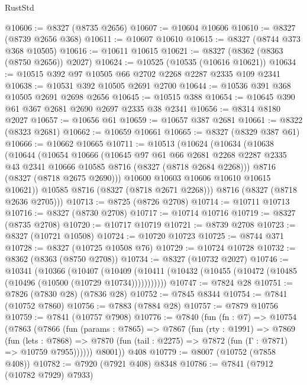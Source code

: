 \begin{lexlean}{RustStd}
\begin{coremodule}
@10606 := @8327 (@8735 @2656)
@10607 := @10604 @10606
@10610 := @8327 (@8739 @2656 @368)
@10611 := @10607 @10610
@10615 := @8327 (@8744 @373 @368 @10505)
@10616 := @10611 @10615
@10621 := @8327 (@8362 (@8363 (@8750 @2656)) @2027)
@10624 := @10525 (@10535 (@10616 @10621))
@10634 := @10515 @392 @97 @10505 @66 @2702 @2268 @2287 @2335 @109 @2341
@10638 := @10531 @392 @10505 @2691 @2700
@10644 := @10536 @391 @368 @10505 @2691 @2698 @2656
@10645 := @10515 @388
@10654 := @10645 @390 @61 @367 @2681 @2690 @2697 @2335 @38 @2341
@10656 := @8314 @8180 @2027
@10657 := @10656 @61
@10659 := @10657 @387 @2681
@10661 := @8322 (@8323 @2681)
@10662 := @10659 @10661
@10665 := @8327 (@8329 @387 @61)
@10666 := @10662 @10665
@10711 := @10513
    (@10624
      (@10634
        (@10638
          (@10644
            (@10654
              @10666
              (@10645
                @97
                @61
                @66
                @2681
                @2268
                @2287
                @2335
                @43
                @2341
                @10666
                @10585
                @8716
                (@8327 (@8718 @2684 @2268)))
              @8716
              (@8327 (@8718 @2675 @2690)))
            @10600
            @10603
            @10606
            @10610
            @10615
            @10621))
        @10585
        @8716
        (@8327 (@8718 @2671 @2268)))
      @8716
      (@8327 (@8718 @2636 @2705)))
@10713 := @8725 (@8726 @2708)
@10714 := @10711 @10713
@10716 := @8327 (@8730 @2708)
@10717 := @10714 @10716
@10719 := @8327 (@8735 @2708)
@10720 := @10717 @10719
@10721 := @8739 @2708
@10723 := @8327 (@10721 @10508)
@10724 := @10720 @10723
@10725 := @8744 @371
@10728 := @8327 (@10725 @10508 @76)
@10729 := @10724 @10728
@10732 := @8362 (@8363 (@8750 @2708))
@10734 := @8327 (@10732 @2027)
@10746 := @10341
    (@10366
      (@10407
        (@10409 (@10411 (@10432 (@10455 (@10472 (@10485 (@10496 (@10500 (@10729 @10734)))))))))))
@10747 := @7824 @28
@10751 := @7826 (@7830 @28) (@7836 @28)
@10752 := @7845 @8344
@10754 := @7841 (@10752 @7860)
@10756 := @7883 (@7884 @28)
@10757 := @7879 @10756
@10759 := @7841 (@10757 @7908)
@10776 := @7840
    (fun (fn : @7) =>
    @10754
      (@7863
        (@7866
          (fun (params : @7865) =>
          @7867
            (fun (rty : @1991) =>
            @7869
              (fun (lets : @7868) =>
              @7870 (fun (tail : @2275) => @7872 (fun (Γ : @7871) => @10759 @7955))))))
        @8001))
    @408
@10779 := @8007 (@10752 (@7858 @408))
@10782 := @7920 (@7921 @408) @8348
@10786 := @7841 (@7912 (@10782 @7929) @7933)

\end{coremodule}
\end{lexlean}
